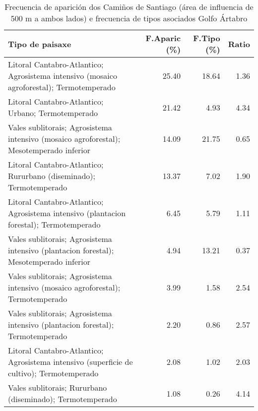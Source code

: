 \begin{table}[p]
\centering
\caption{Frecuencia de aparición dos Camiños de Santiago (área de influencia de 500 m a ambos lados) e frecuencia de tipos asociados Golfo Ártabro} 
\label{vcamino1}
\begin{tabular}{lrrr}
  \hline
Tipo de paisaxe & F.Aparic (\%) & F.Tipo (\%) & Ratio \\ 
  \hline
Litoral Cantabro-Atlantico; Agrosistema intensivo (mosaico agroforestal); Termotemperado & 25.40 & 18.64 & 1.36 \\ 
  Litoral Cantabro-Atlantico; Urbano; Termotemperado & 21.42 & 4.93 & 4.34 \\ 
  Vales sublitorais; Agrosistema intensivo (mosaico agroforestal); Mesotemperado inferior & 14.09 & 21.75 & 0.65 \\ 
  Litoral Cantabro-Atlantico; Rururbano (diseminado); Termotemperado & 13.37 & 7.02 & 1.90 \\ 
  Litoral Cantabro-Atlantico; Agrosistema intensivo (plantacion forestal); Termotemperado & 6.45 & 5.79 & 1.11 \\ 
  Vales sublitorais; Agrosistema intensivo (plantacion forestal); Mesotemperado inferior & 4.94 & 13.21 & 0.37 \\ 
  Vales sublitorais; Agrosistema intensivo (mosaico agroforestal); Termotemperado & 3.99 & 1.58 & 2.54 \\ 
  Vales sublitorais; Agrosistema intensivo (plantacion forestal); Termotemperado & 2.20 & 0.86 & 2.57 \\ 
  Litoral Cantabro-Atlantico; Agrosistema intensivo (superficie de cultivo); Termotemperado & 2.08 & 1.02 & 2.03 \\ 
  Vales sublitorais; Rururbano (diseminado); Termotemperado & 1.08 & 0.26 & 4.14 \\ 
   \hline
\end{tabular}
\end{table}
